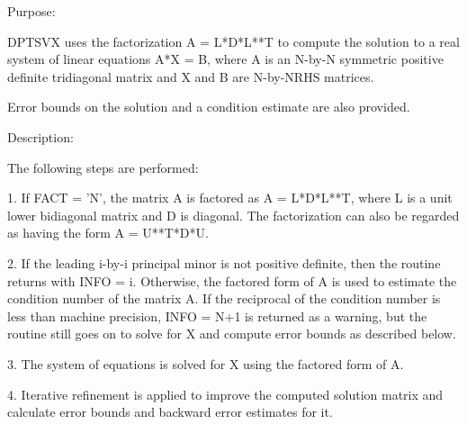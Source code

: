  \begin{DoxyParagraph}{Purpose\+: }
\begin{DoxyVerb} DPTSVX uses the factorization A = L*D*L**T to compute the solution
 to a real system of linear equations A*X = B, where A is an N-by-N
 symmetric positive definite tridiagonal matrix and X and B are
 N-by-NRHS matrices.

 Error bounds on the solution and a condition estimate are also
 provided.\end{DoxyVerb}
 
\end{DoxyParagraph}
\begin{DoxyParagraph}{Description\+: }
\begin{DoxyVerb} The following steps are performed:

 1. If FACT = 'N', the matrix A is factored as A = L*D*L**T, where L
    is a unit lower bidiagonal matrix and D is diagonal.  The
    factorization can also be regarded as having the form
    A = U**T*D*U.

 2. If the leading i-by-i principal minor is not positive definite,
    then the routine returns with INFO = i. Otherwise, the factored
    form of A is used to estimate the condition number of the matrix
    A.  If the reciprocal of the condition number is less than machine
    precision, INFO = N+1 is returned as a warning, but the routine
    still goes on to solve for X and compute error bounds as
    described below.

 3. The system of equations is solved for X using the factored form
    of A.

 4. Iterative refinement is applied to improve the computed solution
    matrix and calculate error bounds and backward error estimates
    for it.\end{DoxyVerb}
 
\end{DoxyParagraph}

